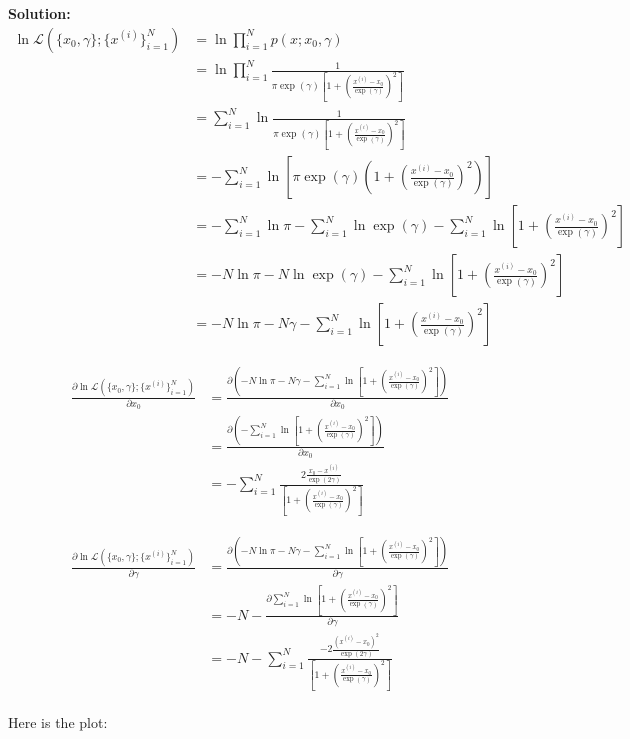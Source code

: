 \documentclass[11pt]{article}
\begin{document}
	 {\noindent \bf Solution: 
	 \begin{equation}
	     \begin{split}
	         \ln \mathcal{L}(\{x_0, \gamma\}; \{x^{(i)}\}_{i = 1}^N)&=\ln\prod\limits_{i=1}^N p( x ; x_0, \gamma )\\
	         &= \ln\prod\limits_{i=1}^N\frac{1}{\pi\exp( \gamma) \left [ 
	1 + \left( \frac{x^{(i)} - x_0}{\exp(\gamma)} \right)^2 \right ]}  \\
	&=\sum\limits_{i=1}^N \ln\frac{1}{\pi\exp( \gamma) \left [ 
	1 + \left( \frac{x^{(i)} - x_0}{\exp(\gamma)} \right)^2 \right ]} \\
	&= -\sum\limits_{i=1}^N \ln\left[\pi\exp( \gamma) 
	\left(1 + \left( \frac{x^{(i)} - x_0}{\exp(\gamma)} \right)^2\right) \right ]\\
	&= -\sum\limits_{i=1}^N\ln\pi-\sum\limits_{i=1}^N\ln\exp(\gamma)-\sum\limits_{i=1}^N\ln\left [ 
	1 + \left( \frac{x^{(i)} - x_0}{\exp(\gamma)} \right)^2 \right ]\\
	&= -N\ln\pi-N\ln\exp(\gamma)-\sum\limits_{i=1}^N\ln\left [ 
	1 + \left( \frac{x^{(i)} - x_0}{\exp(\gamma)} \right)^2 \right ]\\
	&= -N\ln\pi-N\gamma-\sum\limits_{i=1}^N\ln\left [ 
	1 + \left( \frac{x^{(i)} - x_0}{\exp(\gamma)} \right)^2 \right ]
	  \end{split}
	 \end{equation}
	
	\begin{equation}
	    \begin{split}
	    \frac{\partial \ln \mathcal{L}( \{x_0, \gamma\}; \{x^{(i)}\}_{i = 1}^N)}
	{\partial x_0}&=\frac{\partial\left(-N\ln\pi-N\gamma-\sum\limits_{i=1}^N\ln\left [ 
	1 + \left( \frac{x^{(i)} - x_0}{\exp(\gamma)} \right)^2 \right ]\right)}{\partial x_0}\\
	&=\frac{\partial\left(-\sum\limits_{i=1}^N\ln\left [ 
	1 + \left( \frac{x^{(i)} - x_0}{\exp(\gamma)} \right)^2 \right ]\right)}{\partial x_0}\\
	&=-\sum\limits_{i=1}^N\frac{2\frac{x_0 - x^{(i)}}{\exp(2\gamma)}}{\left [ 
	1 + \left( \frac{x^{(i)} - x_0}{\exp(\gamma)} \right)^2 \right ]}
	    \end{split}
	\end{equation} 
	
	\begin{equation}
	    \begin{split}
	        \frac{\partial 
		\ln \mathcal{L}(\{x_0, \gamma\}; \{x^{(i)}\}_{i = 1}^N)}
	{\partial \gamma}&=\frac{\partial\left(-N\ln\pi-N\gamma-\sum\limits_{i=1}^N\ln\left [ 
	1 + \left( \frac{x^{(i)} - x_0}{\exp(\gamma)} \right)^2 \right ]\right)}{\partial \gamma}\\
	&= -N -\frac{\partial\sum\limits_{i=1}^N\ln\left [ 
	1 + \left( \frac{x^{(i)} - x_0}{\exp(\gamma)} \right)^2 \right ]}{\partial \gamma}\\
	&= -N -\sum\limits_{i=1}^N\frac{-2\frac{(x^{(i)} - x_0)^2}{\exp(2\gamma)}}{\left [ 
	1 + \left( \frac{x^{(i)} - x_0}{\exp(\gamma)} \right)^2 \right ]}
	    \end{split}
	\end{equation}
\ \\
Here is the plot:
	
}
\end{document}
